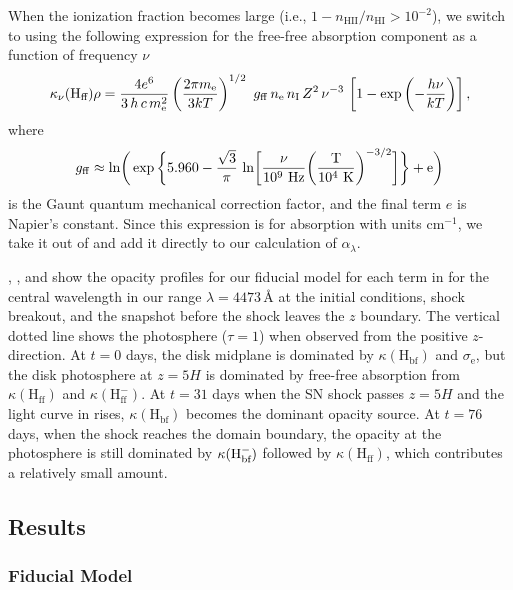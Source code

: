 When the ionization fraction becomes large (i.e., $1 - n_\text{HII}/n_\text{HI}>10^{-2}$), we switch to using the following expression for the free-free absorption component as a function of frequency $\nu$
\begin{equation}
	\kappa_{\nu}(\text{H}_\text{ff}) \rho = \frac{4e^6}{3\, h\, c\, m_{\rm e}^2} \left( \frac{2\pi m_{\rm e}}{3kT} \right)^{1/2} \ g_{\rm ff}\, n_{\rm e}\, n_{\rm I}\, Z^2\, \nu^{-3}\,\left[ 1 - \exp \left(-\frac{h\nu}{kT}\right) \right],
\end{equation}
where
\begin{equation}
    g_{\rm ff} \approx \rm{ln} \bigg( \exp \bigg\{ 5.960 - \frac{\sqrt{3}}{\pi} \ ln \bigg[ \frac{\nu}{10^9\ \rm{Hz}} \bigg( \frac{T}{10^4\ \rm{K}} \bigg)^{-3/2} \bigg] \bigg\} + e \bigg)
\end{equation}
is the Gaunt quantum mechanical correction factor, and the final term $e$ is Napier's constant.
Since this expression is for absorption with units cm$^{-1}$, we take it out of  and add it directly to our calculation of $\alpha_\lambda$. 

, , and  show the opacity profiles for our fiducial model  for each term in  for the central wavelength in our range $\lambda=4473\,\text{\AA}$ at the initial conditions, shock breakout, and the snapshot before the shock leaves the $z$ boundary.
The vertical dotted line shows the photosphere ($\tau=1$) when observed from the positive $z$-direction.
At $t=0$ days, the disk midplane is dominated by $\kappa(\text{H}_\text{bf})$ and $\sigma_\text{e}$, but the disk photosphere at $z=5H$ is dominated by free-free absorption from $\kappa(\text{H}_\text{ff})$ and $\kappa(\text{H}_\text{ff}^-)$.
At $t=31$ days when the SN shock passes $z=5H$ and the light curve in  rises, $\kappa(\text{H}_\text{bf})$ becomes the dominant opacity source.
At $t=76$ days, when the shock reaches the domain boundary, the opacity at the photosphere is still dominated by $\kappa({\rm H}^-_\text{bf})$ followed by $\kappa(\text{H}_\text{ff})$, which contributes a relatively small amount.


\subsection{Results} \label{sec:results}

\subsubsection{Fiducial Model} \label{sec:fiducial-results}

